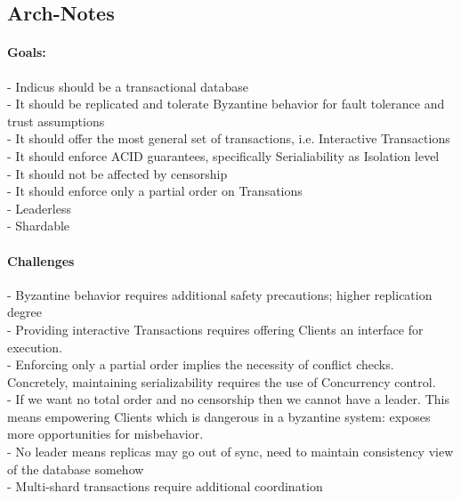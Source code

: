 \subsection{Arch-Notes}

\paragraph{Goals:}

- Indicus should be a transactional database\\
- It should be replicated and tolerate Byzantine behavior for fault tolerance and trust assumptions\\
- It should offer the most general set of transactions, i.e. Interactive Transactions\\
- It should enforce ACID guarantees, specifically Serialiability as Isolation level\\
- It should not be affected by censorship\\
- It should enforce only a partial order on Transations\\
- Leaderless\\
- Shardable\\

\paragraph{Challenges}
- Byzantine behavior requires additional safety precautions; higher replication degree\\
- Providing interactive Transactions requires offering Clients an interface for execution.\\
- Enforcing only a partial order implies the necessity of conflict checks. Concretely, maintaining serializability requires the use of Concurrency control.\\
- If we want no total order and no censorship then we cannot have a leader. This means empowering Clients which is dangerous in a byzantine system: exposes more opportunities for misbehavior.\\
- No leader means replicas may go out of sync, need to maintain consistency view of the database somehow\\
- Multi-shard transactions require additional coordination\\